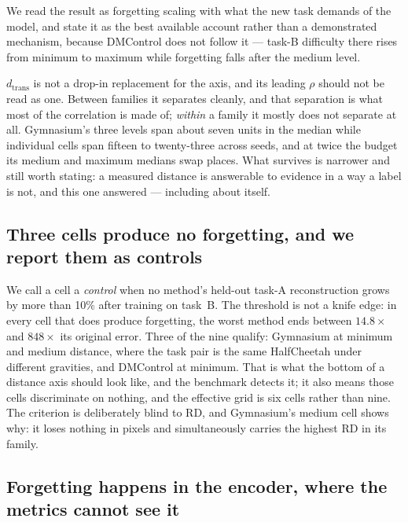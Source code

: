 \documentclass[11pt]{article}
\begin{document}
We read the result as forgetting scaling with what the new task demands of the
model, and state it as the best available account rather than a demonstrated
mechanism, because DMControl does not follow it --- task-B difficulty there
rises from minimum to maximum while forgetting falls after the medium level.

$d_{\mathrm{trans}}$ is not a drop-in replacement for the axis, and its leading
$\rho$ should not be read as one. Between families it separates cleanly, and
that separation is what most of the correlation is made of; \emph{within} a
family it mostly does not separate at all. Gymnasium's three levels span about
seven units in the median while individual cells span fifteen to twenty-three
across seeds, and at twice the budget its medium and maximum medians swap
places. What survives is narrower and still worth stating: a measured distance
is answerable to evidence in a way a label is not, and this one answered ---
including about itself.

\subsection{Three cells produce no forgetting, and we report them as controls}
\label{sec:results:controls}

We call a cell a \emph{control} when no method's held-out task-A reconstruction
grows by more than 10\% after training on task~B. The threshold is not a knife
edge: in every cell that does produce forgetting, the worst method ends between
$14.8\times$ and $848\times$ its original error. Three of the nine qualify:
Gymnasium at minimum and medium distance, where the task pair is the same
HalfCheetah under different gravities, and DMControl at minimum. That is what
the bottom of a distance axis should look like, and the benchmark detects it;
it also means those cells discriminate on nothing, and the effective grid is
six cells rather than nine. The criterion is deliberately blind to RD, and
Gymnasium's medium cell shows why: it loses nothing in pixels and
simultaneously carries the highest RD in its family.

\subsection{Forgetting happens in the encoder, where the metrics cannot see it}
\label{sec:results:encoder}

\begin{table}[t]
  \centering
  
  \caption{Held-out task-A reconstruction error after training on task~B, as a
  factor of the same model's error before it. $1.00$ means nothing was lost.
  $\dagger$ marks control cells.}
  \label{tab:encoder}
\end{table}
\end{document}
